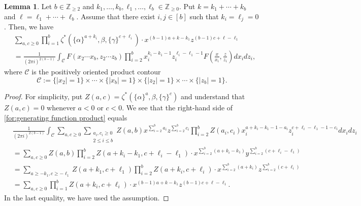 \documentclass[12pt]{amsart}%
\theoremstyle{definition}
\newtheorem{lemma}[theorem]{Lemma}
\begin{document}
\begin{lemma}
\label{lem:hyper_c}
Let $b\in\mathbb{Z}_{\ge 2}$ and $k_1,\ldots,k_b,\ell_1,\ldots,\ell_b\in\mathbb{Z}_{\ge 0}$.
Put $k=k_1+\cdots+k_b$ and $\ell=\ell_1+\cdots+\ell_b$.
Assume that there exist $i,j\in [b]$ such that $k_i=\ell_j=0$.
Then, we have 
\begin{equation}
\label{for:generating function product}
\begin{split}
&\sum_{a,c\ge 0}
\prod^{b}_{i=1}\zeta^{\ast}(\{\alpha\}^{a+k_i},\beta,\{\gamma\}^{c+\ell_i})\cdot x^{(b-1)a+k-k_1}
z^{(b-1)c+\ell-\ell_1}\\
&=\frac{1}{(2\pi i)^{2(b-1)}}\int_{\mathcal{C}}
F(x_2\cdots x_b,z_2\cdots z_b)\prod^{b}_{i=2}
x_i^{k_i-k_1-1}
z_i^{\ell_i-\ell_1-1}
F\left(\frac{x}{x_i},\frac{z}{z_i}\right)dx_idz_i,
\end{split}
\end{equation}
where $\mathcal{C}$ is the positively oriented product contour
\[
\mathcal{C} 
:=\{ |x_2| = 1 \} \times \cdots 
\times \{ |x_b| = 1 \} 
\times \{ |z_2| = 1 \} \times \cdots 
\times \{ |z_b| = 1 \}.
\]
\end{lemma}
\begin{proof}
For simplicity, put 
$Z(a,c)=\zeta^{\ast}(\{\alpha\}^{a},\beta,\{\gamma\}^{c})$
and understand that $Z(a,c)=0$ whenever $a<0$ or $c<0$.
We see that the right-hand side of \eqref{for:generating function product} equals 
\begin{align*}
&\frac{1}{(2\pi i)^{2(b-1)}}
\int_{\mathcal{C}}
\sum_{a,c\ge 0}\sum_{\substack{a_i,c_i\ge 0 \\ 2\le i\le b}}Z(a,b)x^{\sum^b_{i=2}a_i}z^{\sum^{b}_{i=2}c_i}
\prod^{b}_{i=2}Z(a_i,c_i)
x_i^{a+k_i-k_1-1-a_i}
z_i^{c+\ell_i-\ell_1-1-c_i}
dx_idz_i\\
&=\sum_{a,c\ge 0}
Z(a,b)\prod^{b}_{i=2}Z(a+k_i-k_1,c+\ell_i-\ell_1)
\cdot x^{\sum^{b}_{i=2}(a+k_i-k_1)}
y^{\sum^{b}_{i=2}(c+\ell_i-\ell_1)}\\
&=\sum_{a\ge -k_1,c\ge -\ell_1}
Z(a+k_1,c+\ell_1)\prod^{b}_{i=2}Z(a+k_i,c+\ell_i)
\cdot x^{\sum^{b}_{i=2}(a+k_i)}
z^{\sum^{b}_{i=2}(c+\ell_i)}\\
&=\sum_{a,c\ge 0}\prod^{b}_{i=1}Z(a+k_i,c+\ell_i)
\cdot x^{(b-1)a+k-k_1}
z^{(b-1)c+\ell-\ell_1}.
\end{align*}
In the last equality, we have used the assumption.
\end{proof}
\end{document}
